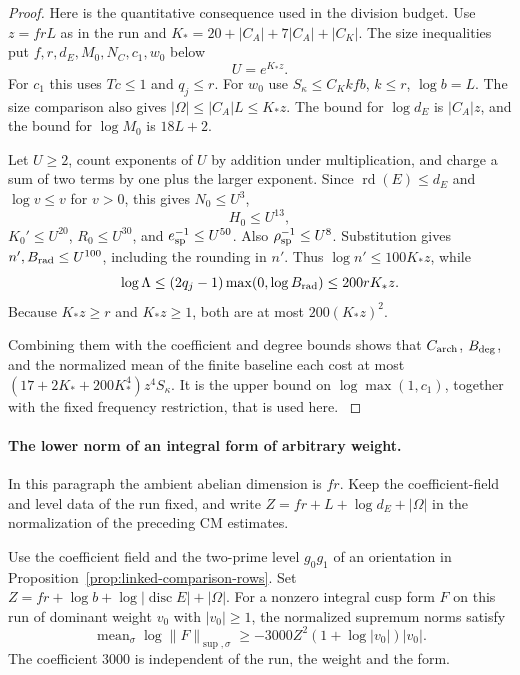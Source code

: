 \begin{proof}
Here is the quantitative consequence used in the division
budget. Use \(z=frL\) as in the run and
\(K_*=20+|C_A|+7|C_A|+|C_K|\).
The size inequalities put \(f,r,d_E,M_0,N_C,c_1,w_0\)
below 
\[
  U=e^{K_*z}.
\]
 For \(c_1\) this uses
\(Tc\le1\) and \(q_j\le r\). For \(w_0\) use
\(S_\kappa\le C_Kkfb\), \(k\le r\), \(\log b=L\).
The size comparison also gives
\(|\Omega|\le |C_A|L\le K_*z\).
The bound for \(\log d_E\) is \(|C_A|z\), and the bound
for \(\log M_0\) is \(18L+2\).

Let \(U\ge2\), count exponents of \(U\) by addition
under multiplication, and charge a sum of two terms by
one plus the larger exponent. Since \(\operatorname{rd}(E)\le d_E\)
and \(\log v\le v\) for \(v>0\), this gives
\(N_0\le U^3\), 
\[
  H_0\le U^{13},
\]
 \(K_0'\le U^{20}\),
\(R_0\le U^{30}\), and \(e_{\rm sp}^{-1}\le U^{50}\).
Also \(\rho_{\rm sp}^{-1}\le U^8\).
Substitution gives \(n',B_{\rm rad}\le U^{100}\), including
the rounding in \(n'\). Thus \(\log n'\le100K_*z\),
while
\[
 \log\Lambda\le(2q_j-1)\max(0,\log B_{\rm rad})
                         \le 200rK_*z .
\]
Because \(K_*z\ge r\) and \(K_*z\ge1\), both are at most
\(200(K_*z)^2\).

Combining them with the coefficient and degree bounds
shows that \(C_{\rm arch}\), \(B_{\rm deg}\), and the
normalized mean of the finite baseline each cost at most
\((17+2K_*+200K_*^4)z^4 S_\kappa\).
It is the upper bound on \(\log\max(1,c_1)\), together
with the fixed frequency restriction, that is used here.
\label{cor:slice-integral-norm-4}

\end{proof}

\paragraph{The lower norm of an integral form of arbitrary weight.}
\label{subsec:deep-cm-interior}
In this paragraph the ambient abelian dimension is \(fr\).
Keep the coefficient-field and level data of the run fixed,
and write \(Z=fr+L+\log d_E+|\Omega|\) in the normalization
of the preceding CM estimates.

\begin{proposition}\label{prop:slice-lower-integral-norm}
Use the coefficient field and the two-prime level \(g_0g_1\)
of an orientation in Proposition~\ref{prop:linked-comparison-rows}.
Set \(Z=fr+\log b+\log|\operatorname{disc} E|+|\Omega|\).
For a nonzero integral cusp form \(F\) on this run of dominant
weight \(v_0\) with \(|v_0|\ge1\), the normalized supremum norms satisfy
\[
 \operatorname{mean}_\sigma\log\|F\|_{\sup,\sigma}
 \ge -3000Z^2(1+\log|v_0|)|v_0| .
\]
The coefficient \(3000\) is independent of the run, the
weight and the form.
\end{proposition}

